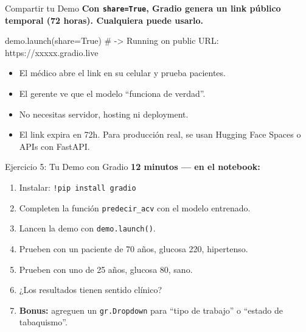 \documentclass[aspectratio=169, 11pt]{beamer}
\begin{document}
\begin{frame}[fragile,shrink=10]{Compartir tu Demo}
  \vspace{-4pt}
  {\footnotesize\color{arcaDark}\bfseries
    Con \texttt{share=True}, Gradio genera un \textbf{link público}
    temporal (72 horas). Cualquiera puede usarlo.}

  \vspace{6pt}
  \begin{pyblock}
demo.launch(share=True)
# -> Running on public URL: https://xxxxx.gradio.live
  \end{pyblock}

  \vspace{6pt}
  {\footnotesize
  \begin{itemize}\setlength{\itemsep}{5pt}
    \item[{\color{codeGreen}\scriptsize\faCheckCircle}]
      El médico abre el link en su celular y prueba pacientes.
    \item[{\color{codeGreen}\scriptsize\faCheckCircle}]
      El gerente ve que el modelo ``funciona de verdad''.
    \item[{\color{codeGreen}\scriptsize\faCheckCircle}]
      No necesitas servidor, hosting ni deployment.
    \item[{\color{arcaRed}\scriptsize\faTimesCircle}]
      El link expira en 72h. Para producción real,
      se usan Hugging Face Spaces o APIs con FastAPI.
  \end{itemize}
  }
\end{frame}

\begin{frame}[shrink=5]{Ejercicio 5: Tu Demo con Gradio}
  \vspace{-4pt}
  {\footnotesize\color{arcaDark}\bfseries
    \faClock\hspace{4pt} 12 minutos --- en el notebook:}

  \vspace{6pt}
  {\footnotesize
  \begin{enumerate}\setlength{\itemsep}{4pt}
    \item Instalar: \texttt{!pip install gradio}
    \item Completen la función \texttt{predecir\_acv} con el modelo entrenado.
    \item Lancen la demo con \texttt{demo.launch()}.
    \item Prueben con un paciente de 70 años, glucosa 220, hipertenso.
    \item Prueben con uno de 25 años, glucosa 80, sano.
    \item ¿Los resultados tienen sentido clínico?
    \item \textbf{Bonus:} agreguen un \texttt{gr.Dropdown} para
      ``tipo de trabajo'' o ``estado de tabaquismo''.
  \end{enumerate}
  }
\end{frame}
\end{document}
